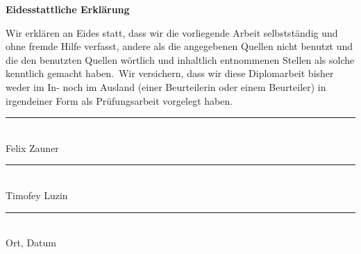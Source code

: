 
\begin{center}
  {\LARGE\bfseries Eidesstattliche Erklärung}
\end{center}

\setlength{\parskip}{4pt}
\noindent
Wir erklären an Eides statt, dass wir die vorliegende Arbeit selbstständig
und ohne fremde Hilfe verfasst, andere als die angegebenen Quellen nicht benutzt
und die den benutzten Quellen wörtlich und inhaltlich entnommenen Stellen als
solche kenntlich gemacht haben.\
Wir versichern, dass wir diese Diplomarbeit bisher weder im In- noch im Ausland
(einer Beurteilerin oder einem Beurteiler) in irgendeiner Form als
Prüfungsarbeit vorgelegt haben.

\vspace{20mm}

\begin{center}
  \begin{minipage}{0.85\textwidth}\centering
    \begin{minipage}{0.4\textwidth}\centering
      \rule{40mm}{0.5pt}\\[-1mm]
      Felix Zauner
    \end{minipage}
    \hfill
    \begin{minipage}{0.4\textwidth}\centering
      \rule{40mm}{0.5pt}\\[-1mm]
      Timofey Luzin
    \end{minipage}
  \end{minipage}

  \vspace{25mm}

  \begin{minipage}{0.6\textwidth}\centering
    \rule{65mm}{0.5pt}\\[-1mm]
    Ort, Datum
  \end{minipage}
\end{center}

\newpage

